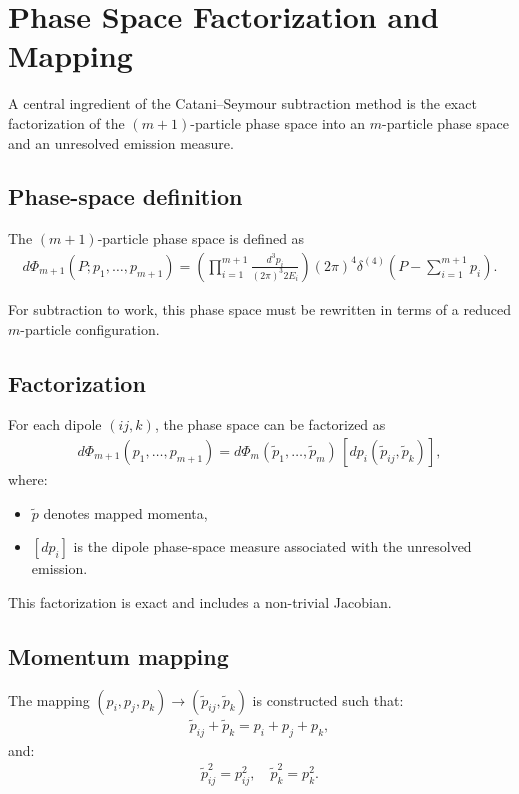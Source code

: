 \section{Phase Space Factorization and Mapping}

A central ingredient of the Catani--Seymour subtraction method is the
exact factorization of the $(m+1)$-particle phase space into an
$m$-particle phase space and an unresolved emission measure.

\subsection{Phase-space definition}

The $(m+1)$-particle phase space is defined as
\begin{align}
d\Phi_{m+1}(P; p_1,\dots,p_{m+1}) =
\left( \prod_{i=1}^{m+1} \frac{d^3 p_i}{(2\pi)^3 2E_i} \right)
(2\pi)^4 \delta^{(4)}\!\left(P - \sum_{i=1}^{m+1} p_i \right).
\end{align}

For subtraction to work, this phase space must be rewritten in terms of
a reduced $m$-particle configuration.

\subsection{Factorization}

For each dipole $(ij,k)$, the phase space can be factorized as
\begin{align}
d\Phi_{m+1}(p_1,\dots,p_{m+1}) =
d\Phi_m(\tilde{p}_1,\dots,\tilde{p}_m)
\, [dp_i(\tilde{p}_{ij}, \tilde{p}_k)],
\end{align}
where:
\begin{itemize}
    \item $\tilde{p}$ denotes mapped momenta,
    \item $[dp_i]$ is the dipole phase-space measure associated with the
    unresolved emission.
\end{itemize}

This factorization is exact and includes a non-trivial Jacobian.

\subsection{Momentum mapping}

The mapping $(p_i, p_j, p_k) \to (\tilde{p}_{ij}, \tilde{p}_k)$ is constructed such that:
\begin{align}
\tilde{p}_{ij} + \tilde{p}_k = p_i + p_j + p_k,
\end{align}
and:
\begin{align}
\tilde{p}_{ij}^2 = p_{ij}^2, \quad \tilde{p}_k^2 = p_k^2.
\end{align}

